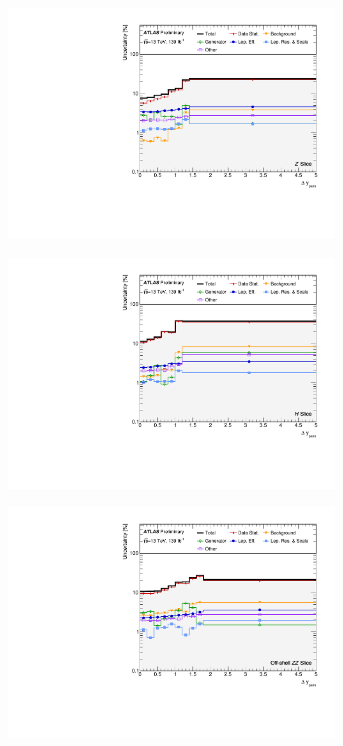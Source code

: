 \begin{figure}[hp]
    \centering
    \begin{subfigure}{.49\textwidth}\centering\includegraphics[width = 0.95\textwidth]{Figures/m4l/Systematics/Unfolded/UnfoldedSys_dYpairs_vs_M4l_Stack_Paper0.pdf}\end{subfigure}
    \begin{subfigure}{.49\textwidth}\centering\includegraphics[width = 0.95\textwidth]{Figures/m4l/Systematics/Unfolded/UnfoldedSys_dYpairs_vs_M4l_Stack_Paper1.pdf}\end{subfigure}
    \begin{subfigure}{.49\textwidth}\centering\includegraphics[width = 0.95\textwidth]{Figures/m4l/Systematics/Unfolded/UnfoldedSys_dYpairs_vs_M4l_Stack_Paper2.pdf}\end{subfigure}

\end{figure}
